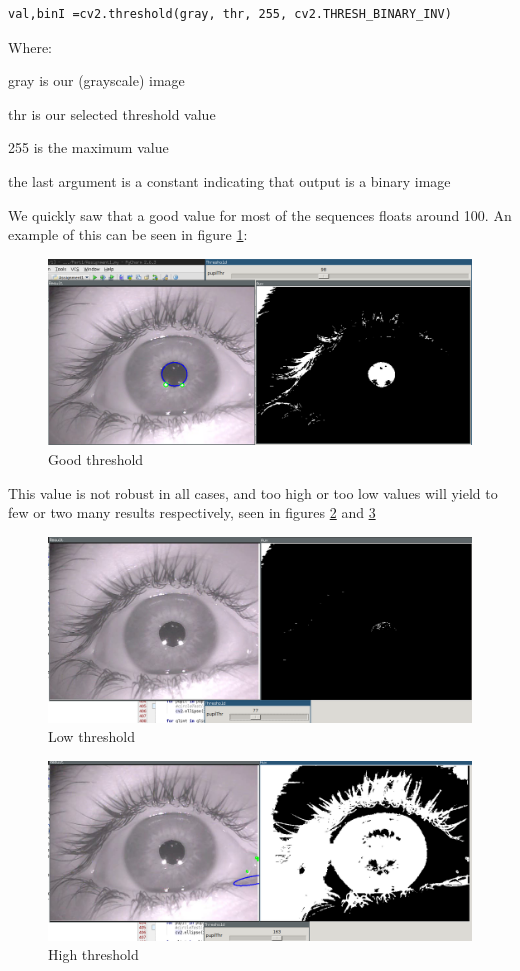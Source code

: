 \begin{verbatim}
val,binI =cv2.threshold(gray, thr, 255, cv2.THRESH_BINARY_INV)
\end{verbatim}
Where:

gray is our (grayscale) image

thr is our selected threshold value

255 is the maximum value

the last argument is a constant indicating that output is a binary image

We quickly saw that a good value for most of the sequences floats around
100. An example of this can be seen in figure \ref{goodthr}:

\begin{figure}[htbp]
\centering
\includegraphics{pics/threshold_good.png}
\caption{Good threshold \label{goodthr}}
\end{figure}

This value is not robust in all cases, and too high or too low values
will yield to few or two many results respectively, seen in figures
\ref{lowthr} and \ref{highthr}

\begin{figure}[htbp]
\centering
\includegraphics{pics/threshold_low.png}
\caption{Low threshold \label{lowthr}}
\end{figure}

\begin{figure}[htbp]
\centering
\includegraphics{pics/threshold_high.png}
\caption{High threshold \label{highthr}}
\end{figure}

